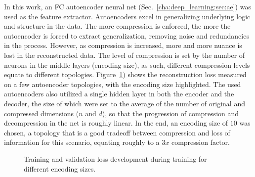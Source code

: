 			In this work, an \ac{FC} autoencoder neural net (Sec.~\ref{cha:deep_learning:sec:ae}) was used as the feature extractor.
			Autoencoders excel in generalizing underlying logic and structure in the data.
			The more compression is enforced, the more the autoencoder is forced to extract generalization, removing noise and redundancies in the process.
			However, as compression is increased, more and more nuance is lost in the reconstructed data.
			The level of compression is set by the number of neurons in the middle layers (encoding size), as such, different compression levels equate to different topologies.
			Figure~\ref{fig:ae_losses}) shows the reconstruction loss measured on a few autoencoder topologies, with the encoding size highlighted.
			The used autoencoders also utilized a single hidden layer in both the encoder and the decoder, the size of which were set to the average of the number of original and compressed dimensions ($n$ and $d$), so that the progression of compression and decompression in the net is roughly linear.
			In the end, an encoding size of $10$ was chosen, a topology that is a good tradeoff between compression and loss of information for this scenario, equating roughly to a $3x$ compression factor.
			
			\begin{figure}[ht]
				\centering
				\caption[AE losses for different encoding sizes]{Training and validation loss development during training for different encoding sizes.}
				\label{fig:ae_losses}
			\end{figure}
			
